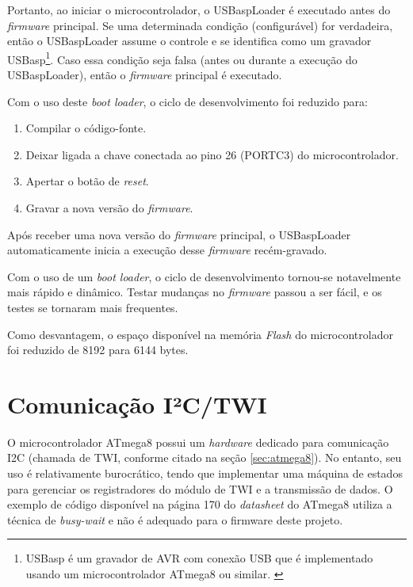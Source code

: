 \documentclass[brazil,pagestart=firstchapter]{abnt}
\begin{document}
Portanto, ao iniciar o microcontrolador, o USBaspLoader é executado antes do
\textit{firmware} principal. Se uma determinada condição (configurável) for
verdadeira, então o USBaspLoader assume o controle e se identifica como um
gravador USBasp\footnote{
	USBasp é um gravador de AVR com conexão USB que é implementado usando um
	microcontrolador ATmega8 ou similar. \cite{USBasp}
}.
Caso essa condição seja falsa (antes ou durante a execução do USBaspLoader),
então o \textit{firmware} principal é executado.

Com o uso deste \textit{boot loader}, o ciclo de desenvolvimento foi
reduzido para:

\begin{enumerate}
\item Compilar o código-fonte.
\item Deixar ligada a chave conectada ao pino 26 (PORTC3) do
microcontrolador.
\item Apertar o botão de \textit{reset}.
\item Gravar a nova versão do \textit{firmware}.
\end{enumerate}

Após receber uma nova versão do \textit{firmware} principal, o USBaspLoader
automaticamente inicia a execução desse \textit{firmware} recém-gravado.

Com o uso de um \textit{boot loader}, o ciclo de desenvolvimento tornou-se
notavelmente mais rápido e dinâmico. Testar mudanças no \textit{firmware}
passou a ser fácil, e os testes se tornaram mais frequentes.

Como desvantagem, o espaço disponível na memória \textit{Flash} do
microcontrolador foi reduzido de \num{8192} para \num{6144} bytes.


\section{Comunicação I²C/TWI}
\label{sec:twi}

O microcontrolador ATmega8 possui um \textit{hardware} dedicado para
comunicação \ac{I2C} (chamada de \ac{TWI}, conforme citado na seção
\ref{sec:atmega8}). No entanto, seu uso é relativamente burocrático, tendo
que implementar uma máquina de estados para gerenciar os registradores do
módulo de \ac{TWI} e a transmissão de dados. \cite[p.~168]{ATmega8} O
exemplo de código disponível na página 170 do \textit{datasheet} do ATmega8
utiliza a técnica de \textit{busy-wait} e não é adequado para o firmware
deste projeto.
\end{document}

